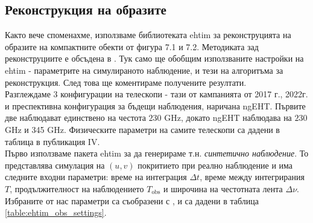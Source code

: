 \subsection{Реконструкция на образите}

Както вече споменахме, използваме библиотеката ehtim за реконструцията на образите на компактните обекти от фигура 7.1 и 7.2. Методиката зад реконструциите е обсъдена в \cite{EHTIM}. Тук само ще обобщим използваните настройки на ehtim - параметрите на симулираното наблюдение, и тези на алгоритъма за реконструкция. След това ще коментираме получените резултати.\\

Разглеждаме 3 конфигурации на телескопи - тази от кампанията от 2017 г., 2022г. и преспективна конфигурация за бъдещи наблюдения, наричана ngEHT. Първите две наблюдават единствено на честота $230$ GHz, докато ngEHT наблюдава на $230$ GHz и 345 GHz. Физическите параметри на самите телескопи са дадени в таблица в публикация IV. \\

Първо използваме пакета ehtim за да генерираме т.н. \emph{синтетично наблюдение}. То представлява симулация на $(u,v)$ покритието при реално наблюдение и има следните входни параметри: време на интеграция $\Delta t$, време между интегрирания $T$, продължителност на наблюдението $T_\text{obs}$ и широчина на честотната лента $\Delta\nu$. Избраните от нас параметри са съобразени с \cite{EHTIM}, и са дадени в таблица \ref{table:ehtim_obs_settings}.\\

